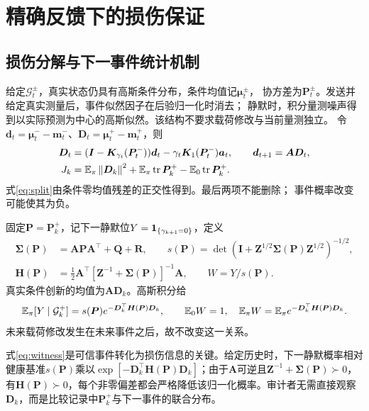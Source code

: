 \section{精确反馈下的损伤保证}
\label{sec:exact}
\subsection{损伤分解与下一事件统计机制}
给定$\mathcal G_t^\pm$，真实状态仍具有高斯条件分布，条件均值记${\bm{\mu}}_t^\pm$，
协方差为${\bm{P}}_t^\pm$。发送并给定真实测量后，事件似然因子在后验归一化时消去；
静默时，积分量测噪声得到以实际预测为中心的高斯似然。该结构不要求载荷修改与当前量测独立。
令${\bm{d}}_t={\bm{\mu}}_t^--{\bm{m}}_t^-$、${\bm{D}}_t={\bm{\mu}}_t^+-{\bm{m}}_t^+$，则
\begin{align}
{\bm{D}}_t&=({\bm{I}}-{\bm{K}}_{\gamma_t}({\bm{P}}_t^-)){\bm{d}}_t-\gamma_t{\bm{K}}_1({\bm{P}}_t^-){\bm{a}}_t,\qquad
{\bm{d}}_{t+1}={\bm{A}}{\bm{D}}_t,\label{eq:bias}\\
J_k&=\mathbb E_\pi\left\|{\bm{D}}_k\right\|^2+
\mathbb E_\pi\operatorname{tr} {\bm{P}}_k^+-\mathbb E_0\operatorname{tr} {\bm{P}}_k^+.\label{eq:split}
\end{align}
式\eqref{eq:split}由条件零均值残差的正交性得到。最后两项不能删除；
事件概率改变可能使其为负。

固定${\bm{P}}={\bm{P}}_k^+$，记下一静默位$Y=\mathbf 1_{\{\gamma_{k+1}=0\}}$，定义
\begin{align}
{\bm{\Sigma}}({\bm{P}})&={\bm{A}}{\bm{P}}{\bm{A}}^\top+{\bm{Q}}+{\bm{R}},\qquad
s({\bm{P}})=\det({\bm{I}}+{\bm{Z}}^{1/2}{\bm{\Sigma}}({\bm{P}}){\bm{Z}}^{1/2})^{-1/2},\nonumber\\
{\bm{H}}({\bm{P}})&=\tfrac12 {\bm{A}}^\top[{\bm{Z}}^{-1}+{\bm{\Sigma}}({\bm{P}})]^{-1}{\bm{A}},\qquad
W=Y/s({\bm{P}}).
\end{align}
真实条件创新的均值为${\bm{A}}{\bm{D}}_k$。高斯积分给
\begin{equation}
\mathbb E_\pi[Y\mid\mathcal G_k^+]=s({\bm{P}})e^{-{\bm{D}}_k^\top {\bm{H}}({\bm{P}}){\bm{D}}_k},
\qquad \mathbb E_0W=1,\quad \mathbb E_\pi W=\mathbb E_\pi e^{-{\bm{D}}_k^\top {\bm{H}}({\bm{P}}){\bm{D}}_k}.
\label{eq:witness}
\end{equation}
未来载荷修改发生在未来事件之后，故不改变这一关系。

式\eqref{eq:witness}是可信事件转化为损伤信息的关键。给定历史时，下一静默概率相对健康基准$s({\bm{P}})$乘以$\exp[-{\bm{D}}_k^\top {\bm{H}}({\bm{P}}){\bm{D}}_k]$；由于${\bm{A}}$可逆且${\bm{Z}}^{-1}+{\bm{\Sigma}}({\bm{P}})\succ0$，有${\bm{H}}({\bm{P}})\succ0$，每个非零偏差都会严格降低该归一化概率。审计者无需直接观察${\bm{D}}_k$，而是比较记录中${\bm{P}}_k^+$与下一事件的联合分布。

